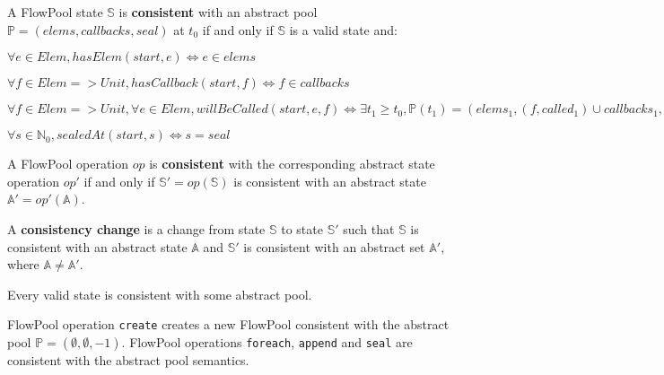 \documentclass[runningheads,a4paper]{llncs}
\begin{document}
\begin{definition}[Consistency]
A FlowPool state $\mathbb{S}$ is \textbf{consistent} with an abstract pool 
$\mathbb{P} = (elems, callbacks, seal)$ at $t_0$ if and only if $\mathbb{S}$ 
is a valid state and:
\begin{description}
\item $\forall e \in Elem, hasElem(start, e) \Leftrightarrow e \in elems$
\item $\forall f \in Elem => Unit, hasCallback(start, f) \Leftrightarrow f \in callbacks$
\item $\forall f \in Elem => Unit, \forall e \in Elem, willBeCalled(start, e, f) \Leftrightarrow \exists t_1 \geq t_0, \mathbb{P}(t_1) = (elems_1, (f, called_1) \cup callbacks_1, seal_1), elems \subseteq called_1$
\item $\forall s \in \mathbb{N}_0, sealedAt(start, s) \Leftrightarrow s = seal$
\end{description}

A FlowPool operation $op$ is \textbf{consistent} with the corresponding 
abstract state operation $op'$ if and only if $\mathbb{S'}=op(\mathbb{S})$ is consistent 
with an abstract state $\mathbb{A'}=op'(\mathbb{A})$.

A \textbf{consistency change} 
is a change from state $\mathbb{S}$ to state $\mathbb{S'}$ such that $\mathbb{S}$ 
is consistent with an abstract state $\mathbb{A}$ and $\mathbb{S'}$ is consistent 
with an abstract set $\mathbb{A'}$, where $\mathbb{A} \neq \mathbb{A'}$.

\end{definition}


\begin{proposition}
Every valid state is consistent with some abstract pool.
\end{proposition}


\begin{theorem}[Safety]
FlowPool operation \verb=create= creates a new FlowPool consistent with the abstract pool 
$\mathbb{P} = (\emptyset, \emptyset, -1)$. FlowPool operations \verb=foreach=, \verb=append= 
and \verb=seal= are consistent with the abstract pool semantics.
\end{theorem}
\end{document}
